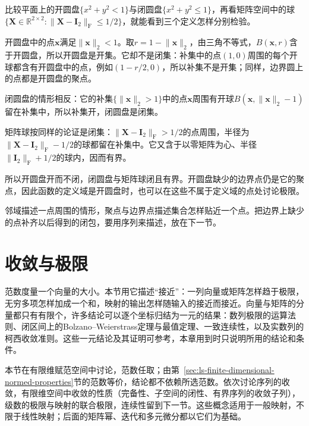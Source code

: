 \begin{example}[圆盘与矩阵球]
\label{ex:multivariable-open-closed-sets}
比较平面上的开圆盘$\{x^2+y^2<1\}$与闭圆盘$\{x^2+y^2\leq1\}$，再看矩阵空间中的球$\{\bm X\in\mathbb R^{2\times2}:\lVert\bm X-\bm I_2\rVert_{\mathrm F}\leq1/2\}$，就能看到三个定义怎样分别检验。

开圆盘中的点$\bm x$满足$\lVert\bm x\rVert_2<1$。取$r=1-\lVert\bm x\rVert_2$，由三角不等式，$B(\bm x,r)$含于开圆盘，所以开圆盘是开集。它却不是闭集：补集中的点$(1,0)$周围的每个开球都含有开圆盘中的点，例如$(1-r/2,0)$，所以补集不是开集；同样，边界圆上的点都是开圆盘的聚点。

闭圆盘的情形相反：它的补集$\{\lVert\bm x\rVert_2>1\}$中的点$\bm x$周围有开球$B(\bm x,\lVert\bm x\rVert_2-1)$留在补集中，所以补集开，闭圆盘是闭集。

矩阵球按同样的论证是闭集：$\lVert\bm X-\bm I_2\rVert_{\mathrm F}>1/2$的点周围，半径为$\lVert\bm X-\bm I_2\rVert_{\mathrm F}-1/2$的球都留在补集中。它又含于以零矩阵为心、半径$\lVert\bm I_2\rVert_{\mathrm F}+1/2$的球内，因而有界。

所以开圆盘开而不闭，闭圆盘与矩阵球闭且有界。开圆盘缺少的边界点仍是它的聚点，因此函数的定义域是开圆盘时，也可以在这些不属于定义域的点处讨论极限。
\end{example}

邻域描述一点周围的情形，聚点与边界点描述集合怎样贴近一个点。把边界上缺少的点补齐以后得到的闭包，要用序列来描述，放在下一节。

\section{收敛与极限}
\label{sec:multivariable-limits-continuity}

范数度量一个向量的大小。本节用它描述“接近”：一列向量或矩阵怎样趋于极限，无穷多项怎样加成一个和，映射的输出怎样随输入的接近而接近。向量与矩阵的分量都只有有限个，许多结论可以逐个坐标归结为一元的结果：数列极限的运算法则、闭区间上的Bolzano--Weierstrass定理与最值定理、一致连续性，以及实数列的柯西收敛准则。这些一元结论及其证明可参考，本章用到时只说明所用的结论和条件。

本节在有限维赋范空间中讨论，范数任取；由第~\ref{sec:ls-finite-dimensional-normed-properties}节的范数等价，结论都不依赖所选范数。依次讨论序列的收敛，有限维空间中收敛的性质（完备性、子空间的闭性、有界序列的收敛子列），级数的极限与映射的联合极限，连续性留到下一节。这些概念适用于一般映射，不限于线性映射；后面的矩阵幂、迭代和多元微分都以它们为基础。

